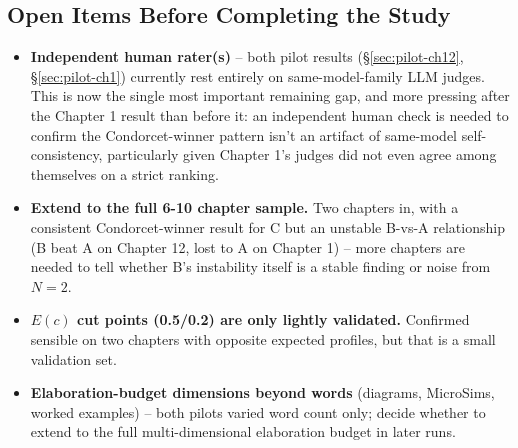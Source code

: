 \subsection{Open Items Before Completing the Study}
\begin{itemize}
    \item \textbf{Independent human rater(s)} -- both pilot results
          (\S\ref{sec:pilot-ch12}, \S\ref{sec:pilot-ch1}) currently rest
          entirely on same-model-family LLM judges. This is now the single
          most important remaining gap, and more pressing after the
          Chapter 1 result than before it: an independent human check is
          needed to confirm the Condorcet-winner pattern isn't an artifact
          of same-model self-consistency, particularly given Chapter 1's
          judges did not even agree among themselves on a strict ranking.
    \item \textbf{Extend to the full 6-10 chapter sample.} Two chapters in,
          with a consistent Condorcet-winner result for C but an unstable
          B-vs-A relationship (B beat A on Chapter 12, lost to A on
          Chapter 1) -- more chapters are needed to tell whether B's
          instability itself is a stable finding or noise from $N=2$.
    \item \textbf{$E(c)$ cut points (0.5/0.2) are only lightly validated.}
          Confirmed sensible on two chapters with opposite expected profiles,
          but that is a small validation set.
    \item \textbf{Elaboration-budget dimensions beyond words} (diagrams,
          MicroSims, worked examples) -- both pilots varied word count only;
          decide whether to extend to the full multi-dimensional elaboration
          budget in later runs.
\end{itemize}

